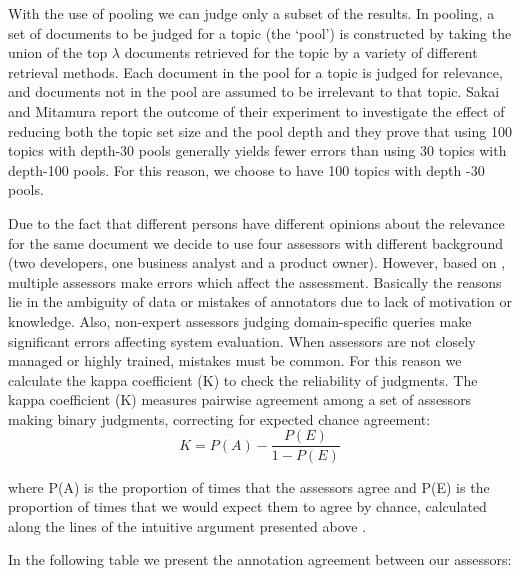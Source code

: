 With the use of pooling we can judge only a subset of the results. In pooling, a set of documents to be judged for a topic (the `pool') is constructed by taking the union of the top $\lambda$ documents retrieved for the topic by a variety of different retrieval methods. Each document in the pool for a topic is judged for relevance, and documents not in the pool are assumed to be irrelevant to that topic.
Sakai and Mitamura \cite{SakaiMitamura} report the outcome of their experiment to investigate the effect of reducing both the topic set size and the pool depth and they prove that using 100 topics with depth-30 pools generally yields fewer errors than using 30 topics with depth-100 pools. For this reason, we choose to have 100 topics with depth -30 pools.


Due to the fact that different persons have different opinions about the relevance for the same document we decide to use four assessors with different background (two developers, one business analyst and a product owner). However, based on \cite{MaskariSandersonClough}, multiple assessors make errors which affect the assessment. Basically the reasons lie in the ambiguity of data or mistakes of annotators due to lack of motivation or knowledge. Also, non-expert assessors judging domain-specific queries make significant errors affecting system evaluation. When assessors are not closely managed or highly trained, mistakes must be common. For this reason we calculate the kappa coefficient (K) to check the reliability of judgments.
The kappa coefficient (K) measures pairwise agreement among a set of assessors making binary judgments, correcting for expected chance agreement:
\begin{equation}
K= P(A) - \frac{P(E)} {1-P(E)}
\end{equation}

where P(A) is the proportion of times that the assessors agree and P(E) is the proportion of times that we would expect them to agree by chance, calculated along the lines of the intuitive argument presented above \cite{Carletta}.

In the following table we present the annotation agreement between our assessors:

